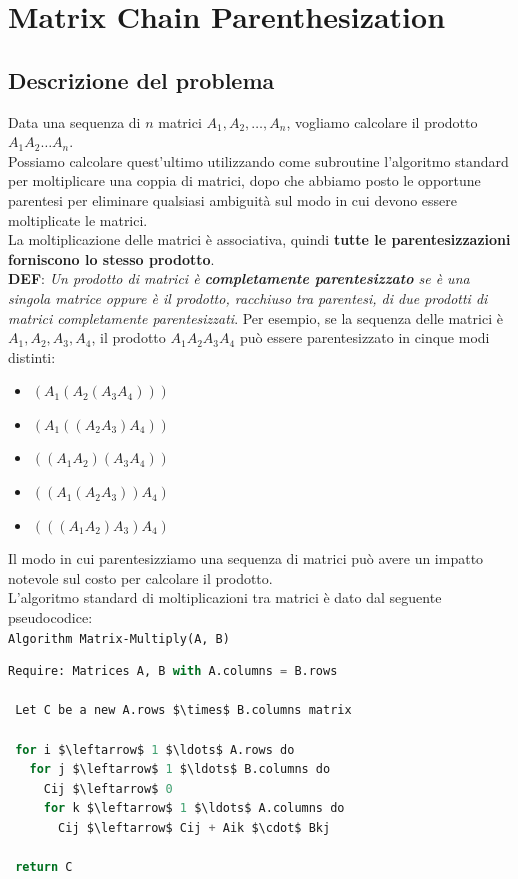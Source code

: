 \chapter{Matrix Chain Parenthesization}

\section{Descrizione del problema}

Data una sequenza di $n$ matrici $A_1, A_2, \ldots, A_n$, vogliamo
calcolare il prodotto $A_1A_2 \ldots A_n$.\\

Possiamo calcolare quest'ultimo utilizzando come subroutine l'algoritmo
standard per moltiplicare una coppia di matrici, dopo che abbiamo posto
le opportune parentesi per eliminare qualsiasi ambiguità sul modo in cui
devono essere moltiplicate le matrici.\\ La moltiplicazione delle matrici
è associativa, quindi \textbf{tutte le parentesizzazioni forniscono lo
  stesso prodotto}.\\

\textbf{DEF}: \emph{Un prodotto di matrici è \textbf{completamente
    parentesizzato} se è una singola matrice oppure è il prodotto, racchiuso
  tra parentesi, di due prodotti di matrici completamente parentesizzati}.
Per esempio, se la sequenza delle matrici è $A_1, A_2, A_3, A_4$, il
prodotto $A_1 A_2 A_3 A_4$ può essere parentesizzato in cinque modi
distinti:
\begin{itemize}
  \item $(A_1 (A_2 (A_3 A_4)))$
  \item $(A_1 ((A_2 A_3) A_4))$
  \item $((A_1 A_2 )(A_3 A_4))$
  \item $((A_1 (A_2 A_3 ))A_4)$
  \item $(((A_1 A_2) A_3 )A_4)$
\end{itemize}

Il modo in cui parentesizziamo una sequenza di matrici può avere un
impatto notevole sul costo per calcolare il prodotto.\\

L'algoritmo standard di moltiplicazioni tra matrici è dato dal seguente
pseudocodice:\\
\texttt{Algorithm\ Matrix-Multiply(A, B)}
\begin{lstlisting}[language=Python, mathescape=true]
 Require: Matrices A, B with A.columns = B.rows

 Let C be a new A.rows $\times$ B.columns matrix
 
 for i $\leftarrow$ 1 $\ldots$ A.rows do
   for j $\leftarrow$ 1 $\ldots$ B.columns do
     Cij $\leftarrow$ 0
     for k $\leftarrow$ 1 $\ldots$ A.columns do
       Cij $\leftarrow$ Cij + Aik $\cdot$ Bkj
 
 return C
\end{lstlisting}

